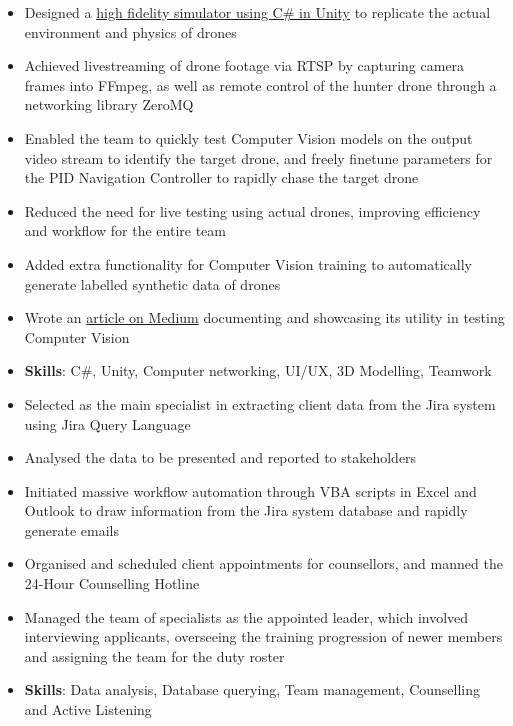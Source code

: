 \documentclass{cv}
\begin{document}
\begin{subsections}
    \subtitle{Command, Control and Communications Development, Defence Science and Technology Agency \hfill Singapore}
    \begin{itemize}
        \item Designed a \href{https://github.com/thedylone/unity-drone-simulator}{high fidelity simulator using C\# in Unity} to replicate the actual environment and physics of drones
        \item Achieved livestreaming of drone footage via RTSP by capturing camera frames into FFmpeg, as well as remote control of the hunter drone through a networking library ZeroMQ
        \item Enabled the team to quickly test Computer Vision models on the output video stream to identify the target drone, and freely finetune parameters for the PID Navigation Controller to rapidly chase the target drone
        \item Reduced the need for live testing using actual drones, improving efficiency and workflow for the entire team
        \item Added extra functionality for Computer Vision training to automatically generate labelled synthetic data of drones
        \item Wrote an \href{https://medium.com/d-classified/unity-as-a-testbed-for-autonomy-development-1e326323c68d}{article on Medium} documenting and showcasing its utility in testing Computer Vision
        \item \textbf{Skills}: C\#, Unity, Computer networking, UI/UX, 3D Modelling, Teamwork
    \end{itemize}

    \subtitle{SAF Counselling Centre \hfill Singapore}
    \begin{itemize}
        \item Selected as the main specialist in extracting client data from the Jira system using Jira Query Language
        \item Analysed the data to be presented and reported to stakeholders
        \item Initiated massive workflow automation through VBA scripts in Excel and Outlook to draw information from the Jira system database and rapidly generate emails
        \item Organised and scheduled client appointments for counsellors, and manned the 24-Hour Counselling Hotline
        \item Managed the team of specialists as the appointed leader, which involved interviewing applicants, overseeing the training progression of newer members and assigning the team for the duty roster
        \item \textbf{Skills}: Data analysis, Database querying, Team management, Counselling and Active Listening
    \end{itemize}
\end{subsections}
\end{document}
